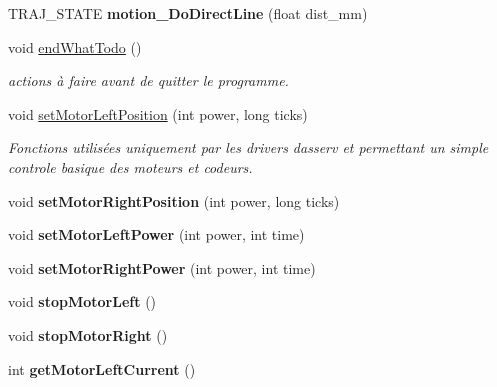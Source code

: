 \begin{DoxyCompactItemize}
T\+R\+A\+J\+\_\+\+S\+T\+A\+TE {\bfseries motion\+\_\+\+Do\+Direct\+Line} (float dist\+\_\+mm)
\item 
\mbox{\label{classAsservDriver_a636bf5413d2cf0419f188a4965340758}} 
void \hyperlink{classAsservDriver_a636bf5413d2cf0419f188a4965340758}{end\+What\+Todo} ()
\begin{DoxyCompactList}\small\item\em actions à faire avant de quitter le programme. \end{DoxyCompactList}\item 
\mbox{\label{classAsservDriver_a49dad05da23fe62aa4bf582199eaa3a6}} 
void \hyperlink{classAsservDriver_a49dad05da23fe62aa4bf582199eaa3a6}{set\+Motor\+Left\+Position} (int power, long ticks)
\begin{DoxyCompactList}\small\item\em Fonctions utilisées uniquement par les drivers d\textquotesingle{}asserv et permettant un simple controle basique des moteurs et codeurs. \end{DoxyCompactList}\item 
\mbox{\label{classAsservDriver_a62a57e92e4933413d9c3c6b62f496ef3}} 
void {\bfseries set\+Motor\+Right\+Position} (int power, long ticks)
\item 
\mbox{\label{classAsservDriver_a3b702233fa09a657bb03372470152376}} 
void {\bfseries set\+Motor\+Left\+Power} (int power, int time)
\item 
\mbox{\label{classAsservDriver_a54e742670bae9a19dc70b982cad4c3ba}} 
void {\bfseries set\+Motor\+Right\+Power} (int power, int time)
\item 
\mbox{\label{classAsservDriver_a69fb8c78d0ced7bd7f330c18952c84f4}} 
void {\bfseries stop\+Motor\+Left} ()
\item 
\mbox{\label{classAsservDriver_ab24bc1636143db604ecbad3b18a17c8c}} 
void {\bfseries stop\+Motor\+Right} ()
\item 
\mbox{\label{classAsservDriver_ab93d873dc060cff42befa9e50a4a0b32}} 
int {\bfseries get\+Motor\+Left\+Current} ()

\end{DoxyCompactItemize}
